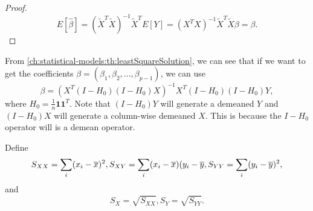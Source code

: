\begin{refsection}
\begin{proof}
	$$E[\hat{\beta}] = (\tilde{X}^T\tilde{X})^{-1}\tilde{X}^T E[Y] = (X^TX)^{-1}\tilde{X}^T\tilde{X}\beta = \beta.$$
\end{proof}

\begin{remark}
From \autoref{ch:statistical-models:th:leastSquareSolution}, we can see that if we want to get the coefficients $\beta = (\beta_1,\beta_2,...,\beta_{p-1})$, we can use
$$\beta = (X^T(I-H_{0})(I-H_{0})X)^{-1}X^T(I - H_{0})(I - H_{0})Y,$$
where $H_{0} = \frac{1}{n}\bm{1}\bm{1}^T$.
Note that $(I - H_{0})Y$ will generate a demeaned $Y$ and $(I - H_{0})X$ will generate a column-wise demeaned $X$. This is because the $I - H_0$ operator will is a demean operator.
\end{remark}



\begin{corollary}\label{ch:regression-analysis:th:leastSquareSolutionSimpleLinearRegression}
Define
$$S_{XX} = \sum_i (x_{i}-\overline{x})^2, S_{XY} =  \sum_i (x_{i}-\overline{x})(y_i - \overline{y}, S_{YY} = \sum_i (y_{i}-\overline{y})^2,$$
and
$$S_{X} = \sqrt{S_{XX}}, S_Y = \sqrt{S_{YY}}.$$


\end{corollary}
\end{refsection}
